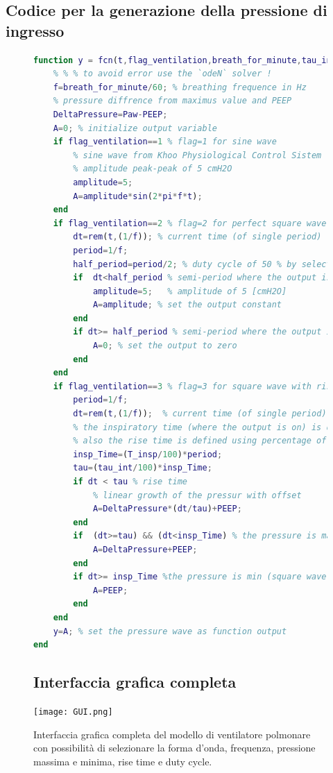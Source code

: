\subsection*{Codice per la generazione della pressione di ingresso}
 \begin{figure}[h!]
\begin{lstlisting}[language=matlab,basicstyle=\tiny\ttfamily,]
function y = fcn(t,flag_ventilation,breath_for_minute,tau_int,Paw,PEEP,T_insp)
	% % % to avoid error use the `odeN` solver !
	f=breath_for_minute/60; % breathing frequence in Hz
	% pressure diffrence from maximus value and PEEP
	DeltaPressure=Paw-PEEP; 
	A=0; % initialize output variable
	if flag_ventilation==1 % flag=1 for sine wave
		% sine wave from Khoo Physiological Control Sistem
		% amplitude peak-peak of 5 cmH2O
		amplitude=5;
		A=amplitude*sin(2*pi*f*t);  
	end
	if flag_ventilation==2 % flag=2 for perfect square wave
		dt=rem(t,(1/f)); % current time (of single period)
		period=1/f; 
		half_period=period/2; % duty cycle of 50 % by selecting half period
		if  dt<half_period % semi-period where the output is on
			amplitude=5;   % amplitude of 5 [cmH2O] 
			A=amplitude; % set the output constant
		end
		if dt>= half_period % semi-period where the output is zero
			A=0; % set the output to zero 
		end 
	end
	if flag_ventilation==3 % flag=3 for square wave with rise time tau
		period=1/f; 
		dt=rem(t,(1/f));  % current time (of single period)
		% the inspiratory time (where the output is on) is defined  usign percentage of total period with T_insp from ventilator GUI
		% also the rise time is defined using percentage of inspiratory time with tau_int from ventilator GUI
		insp_Time=(T_insp/100)*period; 
		tau=(tau_int/100)*insp_Time;
		if dt < tau % rise time
			% linear growth of the pressur with offset 
			A=DeltaPressure*(dt/tau)+PEEP; 
		end
		if  (dt>=tau) && (dt<insp_Time) % the pressure is max (square wave on)
			A=DeltaPressure+PEEP;
		end
		if dt>= insp_Time %the pressure is min (square wave off)
			A=PEEP;
		end 
	end
	y=A; % set the pressure wave as function output
end
\end{lstlisting}

\subsection*{Interfaccia grafica completa}

\centering\texttt{[image: GUI.png]}
	\caption{Interfaccia grafica completa del modello di ventilatore polmonare con possibilità di selezionare la forma d'onda, frequenza, pressione massima e minima, rise time e duty cycle.}
	\label{fig:interfaccia}
\end{figure}

